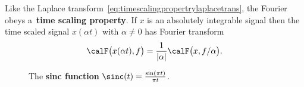 \documentclass[11pt,a4paper]{book}
\theoremstyle{plain}
\numberwithin{equation}{section}
\newcommand{\term}{\textbf}
\newcommand{\abs}[1]{\left\vert #1 \right\vert}
\newcommand{\vtick}[1]{\draw (#1,-0.075) -- (#1,0.075) }
\newcommand{\htick}[1]{\draw (-0.075,#1) -- (0.075,#1)}
\begin{document}
Like the Laplace transform~\eqref{eq:timescalingpropertrylaplacetrans}, the Fourier obeys a~\term{time scaling property}.  If $x$ is an absolutely integrable signal then the time scaled signal $x(\alpha t)$ with $\alpha \neq 0$ has Fourier transform
\begin{equation}\label{eq:timescalingpropertryfouriertrans}
\calF\big( x(\alpha t), f \big) = \frac{1}{\abs{\alpha}} \calF\big( x , f/\alpha \big).
\end{equation}




\begin{figure}
\centering
{}
\caption{The \term{sinc function} $\sinc(t) = \frac{\sin(\pi t)}{\pi t}$.} \label{fig:sincfunction1}
\end{figure}
\end{document}
